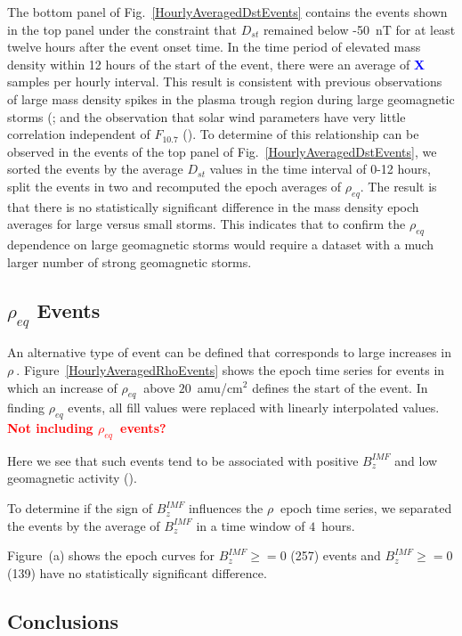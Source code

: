 \documentclass[10pt,twocolumn]{article}
\newcommand{\vinote}[1]{\textcolor{red}{\textbf{#1}}} %
\newcommand{\req}{\ensuremath{\rho_{eq}}}
\newcommand{\inote}[1]{\textcolor{blue}{\textbf{#1}}} %
\def\note#1\par{\textcolor{blue}{\textbf{#1}}\\}
\begin{document}
The bottom panel of Fig.~\ref{HourlyAveragedDstEvents} contains the events shown in the top panel under the constraint that $D_{st}$ remained below -50~nT for at least twelve hours after the event onset time.  In the time period of elevated mass density within 12 hours of the start of the event, there were an average of \inote{X} samples per hourly interval.  This result is consistent with previous observations of large mass density spikes in the plasma trough region during large geomagnetic storms (\cite{Yao2008}; \cite{Takahashi2010} and the observation that solar wind parameters have very little correlation independent of $F_{10.7}$ (\cite{Denton2016}).  To determine of this relationship can be observed in the events of the top panel of Fig.~\ref{HourlyAveragedDstEvents}, we sorted the events by the average $D_{st}$ values in the time interval of 0-12 hours, split the events in two and recomputed the epoch averages of $\rho_{eq}$.  The result is that there is no statistically significant difference in the mass density epoch averages for large versus small storms.  This indicates that to confirm the $\rho_{eq}$ dependence on large geomagnetic storms would require a dataset with a much larger number of strong geomagnetic storms.

\subsection{$\rho_{eq}$ Events}

An alternative type of event can be defined that corresponds to large increases in $\rho\ $.  Figure~\ref{HourlyAveragedRhoEvents} shows the epoch time series for events in which an increase of $\req\ $ above $20$~amu/cm$^2$ defines the start of the event. In finding $\rho_{eq}$ events, all fill values were replaced with linearly interpolated values. \vinote{Not including \req\ events?}

Here we see that such events tend to be associated with positive $B_z^{IMF}$ and low geomagnetic activity (\cite{Denton2016}). 

To determine if the sign of $B_z^{IMF}$ influences the $\rho\ $ epoch time series, we separated the events by the average of $B_z^{IMF}$ in a time window of $4$~hours.  

Figure~\label{fig:RhoBinned}(a) shows the epoch curves for $B_z^{IMF}\geq=0$ (257) events and $B_z^{IMF}\ge=0$ (139) have no statistically significant difference.

\subsection{Conclusions}
\end{document}
